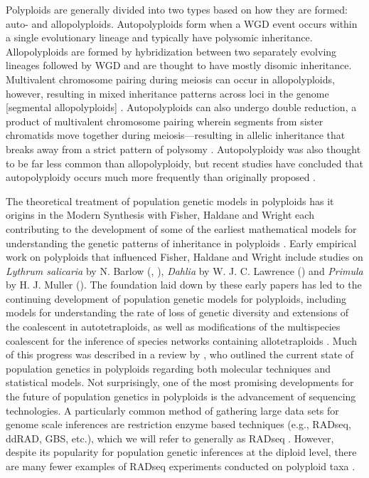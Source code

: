 \documentclass[11pt,english,letterpaper,oneside]{article}
\begin{document}
Polyploids are generally divided into two types based on how they are formed: auto- and allopolyploids. Autopolyploids form when a WGD event occurs within a single evolutionary lineage and typically have polysomic inheritance. Allopolyploids are formed by hybridization between two separately evolving lineages followed by WGD and are thought to have mostly disomic inheritance. Multivalent chromosome pairing during meiosis can occur in allopolyploids, however, resulting in mixed inheritance patterns across loci in the genome [segmental allopolyploids] \citep{StebbinsVariationEvolution}. Autopolyploids can also undergo double reduction, a product of multivalent chromosome pairing wherein segments from sister chromatids move together during meiosis---resulting in allelic inheritance that breaks away from a strict pattern of polysomy \citep{haldane1930autopolyploids}. Autopolyploidy was also thought to be far less common than allopolyploidy, but recent studies have concluded that autopolyploidy occurs much more frequently than originally proposed \citep{soltis2007autopolyploidy,parisod2010autopolyploidy}.
\medskip

The theoretical treatment of population genetic models in polyploids has it origins in the Modern Synthesis with  Fisher, Haldane and Wright each contributing to the development of some of the earliest mathematical models for understanding the genetic patterns of inheritance in polyploids \citep{haldane1930autopolyploids,wright1938polyploid,fisher1943doublereduction}. Early empirical work on polyploids that influenced Fisher, Haldane and Wright include studies on \textit{Lythrum salicaria} by N. Barlow (\citeyear{barlow1913heterostylism}, \citeyear{barlow1923trimorphic}), \textit{Dahlia} by W. J. C. Lawrence (\citeyear{lawrence1929dahlia}) and \textit{Primula} by H. J. Muller (\citeyear{muller1914primula}). The foundation laid down by these early papers has led to the continuing development of population genetic models for polyploids, including models for understanding the rate of loss of genetic diversity and extensions of the coalescent in autotetraploids, as well as modifications of the multispecies coalescent for the inference of species networks containing allotetraploids \citep{moody1993autopolyploids,arnold2012autotetraploidCoal,jones2013allopolyploid}. Much of this progress was described in a review by \cite{dufresne2014polyPopGen}, who outlined the current state of population genetics in polyploids regarding both molecular techniques and statistical models. Not surprisingly, one of the most promising developments for the future of population genetics in polyploids is the advancement of sequencing technologies. A particularly common method of gathering large data sets for genome scale inferences are restriction enzyme based techniques (e.g., RADseq, ddRAD, GBS, etc.), which we will refer to generally as RADseq \citep{miller2007gbs,baird2008radTags,peterson2012ddrad,puritz2014demystifyingRAD}. However, despite its popularity for population genetic inferences at the diploid level, there are many fewer examples of RADseq experiments conducted on polyploid taxa \citep[but see][]{ogden2013sturgeonRADseq,wang2013birchRADseq,logan-young2015polyploidSNP}.
\medskip
\end{document}
